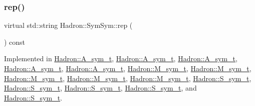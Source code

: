 \mbox{\label{structHadron_1_1SymSym_aa6e588740862036933a9efe085a5e5e5}} 
\subsubsection{\texorpdfstring{rep()}{rep()}\hspace{0.1cm}{\footnotesize\ttfamily [1/2]}}
{\footnotesize\ttfamily virtual std\+::string Hadron\+::\+Sym\+Sym\+::rep (\begin{DoxyParamCaption}{ }\end{DoxyParamCaption}) const\hspace{0.3cm}{\ttfamily [pure virtual]}}



Implemented in \mbox{\hyperlink{structHadron_1_1A__sym__t_ac60fe125eeb713995aafa4712e23f919}{Hadron\+::\+A\+\_\+sym\+\_\+t}}, \mbox{\hyperlink{structHadron_1_1A__sym__t_ac60fe125eeb713995aafa4712e23f919}{Hadron\+::\+A\+\_\+sym\+\_\+t}}, \mbox{\hyperlink{structHadron_1_1A__sym__t_ac60fe125eeb713995aafa4712e23f919}{Hadron\+::\+A\+\_\+sym\+\_\+t}}, \mbox{\hyperlink{structHadron_1_1A__sym__t_ac60fe125eeb713995aafa4712e23f919}{Hadron\+::\+A\+\_\+sym\+\_\+t}}, \mbox{\hyperlink{structHadron_1_1A__sym__t_ac60fe125eeb713995aafa4712e23f919}{Hadron\+::\+A\+\_\+sym\+\_\+t}}, \mbox{\hyperlink{structHadron_1_1M__sym__t_ad90bc816709bb65ec3e0b804090fbefe}{Hadron\+::\+M\+\_\+sym\+\_\+t}}, \mbox{\hyperlink{structHadron_1_1M__sym__t_ad90bc816709bb65ec3e0b804090fbefe}{Hadron\+::\+M\+\_\+sym\+\_\+t}}, \mbox{\hyperlink{structHadron_1_1M__sym__t_ad90bc816709bb65ec3e0b804090fbefe}{Hadron\+::\+M\+\_\+sym\+\_\+t}}, \mbox{\hyperlink{structHadron_1_1M__sym__t_ad90bc816709bb65ec3e0b804090fbefe}{Hadron\+::\+M\+\_\+sym\+\_\+t}}, \mbox{\hyperlink{structHadron_1_1M__sym__t_ad90bc816709bb65ec3e0b804090fbefe}{Hadron\+::\+M\+\_\+sym\+\_\+t}}, \mbox{\hyperlink{structHadron_1_1S__sym__t_a1a8ccb60f6d70c9a00b8683ad8eac195}{Hadron\+::\+S\+\_\+sym\+\_\+t}}, \mbox{\hyperlink{structHadron_1_1S__sym__t_a1a8ccb60f6d70c9a00b8683ad8eac195}{Hadron\+::\+S\+\_\+sym\+\_\+t}}, \mbox{\hyperlink{structHadron_1_1S__sym__t_a1a8ccb60f6d70c9a00b8683ad8eac195}{Hadron\+::\+S\+\_\+sym\+\_\+t}}, \mbox{\hyperlink{structHadron_1_1S__sym__t_a1a8ccb60f6d70c9a00b8683ad8eac195}{Hadron\+::\+S\+\_\+sym\+\_\+t}}, and \mbox{\hyperlink{structHadron_1_1S__sym__t_a1a8ccb60f6d70c9a00b8683ad8eac195}{Hadron\+::\+S\+\_\+sym\+\_\+t}}.

